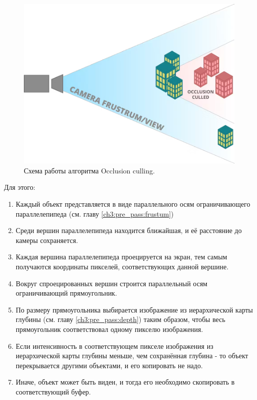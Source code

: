 		\begin{figure}[ht!] 
			\center
			\includegraphics [scale=0.27] {my_folder/images//occlusion_culling}	
			\caption{Схема работы алгоритма Occlusion culling.} 
			\label{fig:occlusion_culling}
		\end{figure}
		
		Для этого:
		\begin{enumerate}[1.]
			\item Каждый объект представляется в виде параллельного осям ограничивающего параллелепипеда (см. главу \ref{ch3:pre_pass:frustum})
		 	\item Среди вершин параллелепипеда находится ближайшая, и её расстояние до камеры сохраняется.
		 	\item Каждая вершина параллелепипеда проецируется на экран, тем самым получаются координаты пикселей, соответствующих данной вершине.
		 	\item Вокруг спроецированных вершин строится параллельный осям ограничивающий прямоугольник.
		 	\item По размеру прямоугольника выбирается изображение из иерархической карты глубины (см. главу \ref{ch3:pre_pass:depth}) таким образом, чтобы весь прямоугольник соответствовал одному пикселю изображения.
		 	\item Если интенсивность в соответствующем пикселе изображения из иерархической карты глубины меньше, чем сохранённая глубина - то объект перекрывается другими объектами, и его копировать не надо. 
		 	\item Иначе, объект может быть виден, и тогда его необходимо скопировать в соответствующий буфер. 
		\end{enumerate}
		
